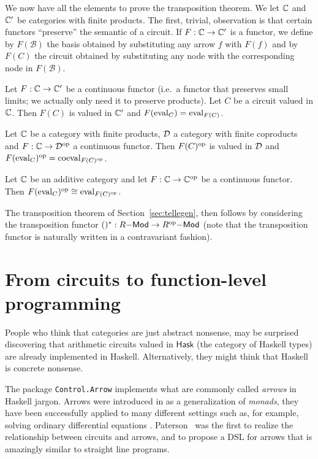 We now have all the elements to prove the transposition theorem. We
let $\mathbb{C}$ and $\mathbb{C}'$ be categories with finite products.  The first,
trivial, observation is that certain functors ``preserve'' the
semantic of a circuit. If $F:\mathbb{C}\rightarrow\mathbb{C}'$ is a functor, we define by
$F(\mathcal{B})$ the basis obtained by substituting any arrow $f$ with
$F(f)$ and by $F(C)$ the circuit obtained by substituting any node
with the corresponding node in $F(\mathcal{B})$.

\begin{proposition}
  Let $F:\mathbb{C}\rightarrow\mathbb{C}'$ be a continuous functor (i.e.\ a functor that
  preserves small limits; we actually only need it to preserve
  products). Let $C$ be a circuit valued in $\mathbb{C}$. Then $F(C)$ is
  valued in $\mathbb{C}'$ and $F(\operatorname{eval}_C)=\operatorname{eval}_{F(C)}$.
\end{proposition}

\begin{corollary}
  Let $\mathbb{C}$ be a category with finite products, $\mathcal{D}$ a category with
  finite coproducts and $F:\mathbb{C}\rightarrow\mathcal{D}^{\mathrm{op}}$ a continuous functor. Then
  $F(C)^{\mathrm{op}}$ is valued in $\mathcal{D}$ and $F(\operatorname{eval}_C)^{\mathrm{op}}=\operatorname{coeval}_{F(C)^{\mathrm{op}}}$.
\end{corollary}

\begin{corollary}
  Let $\mathbb{C}$ be an additive category and let $F:\mathbb{C}\rightarrow\mathbb{C}^{\mathrm{op}}$ be a
  continuous functor. Then $F(\operatorname{eval}_{C})^{\mathrm{op}}\cong\operatorname{eval}_{F(C)^{\mathrm{op}}}$.
\end{corollary}

The transposition theorem of Section~\ref{sec:tellegen}, then follows
by considering the transposition functor $()^\ast:R\mathsf{-Mod}\rightarrow
R^{\mathrm{op}}\mathsf{-Mod}$ (note that the transposition functor is naturally
written in a contravariant fashion).


\section{From circuits to function-level programming}
\label{sec:fp}
\lstset{language=haskell} People who think that categories are just
abstract nonsense, may be surprised discovering that arithmetic
circuits valued in $\mathsf{Hask}$ (the category of Haskell types) are
already implemented in Haskell. Alternatively, they might think that
Haskell is concrete nonsense.

The package \lstinline+Control.Arrow+ implements what are commonly
called \emph{arrows} in Haskell jargon. Arrows were introduced in
\cite{hughes98} as a generalization of \emph{monads}, they have been
successfully applied to many different settings such as, for example,
solving ordinary differential equations
\cite{liu+hudak10}. Paterson~\cite{paterson01} was the first to
realize the relationship between circuits and arrows, and to propose a
DSL for arrows that is amazingly similar to straight line programs.

